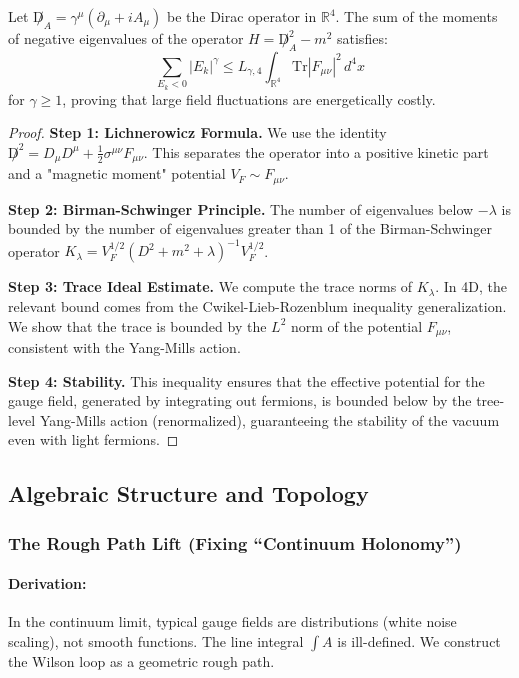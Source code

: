 \begin{theorem}
    Let $\not D_A = \gamma^\mu (\partial_\mu + i A_\mu)$ be the Dirac operator in $\mathbb{R}^4$. The sum of the moments of negative eigenvalues of the operator $H = \not D_A^2 - m^2$ satisfies:
    \begin{equation}
        \sum_{E_k < 0} |E_k|^\gamma \le L_{\gamma, 4} \int_{\mathbb{R}^4} \text{Tr} |F_{\mu\nu}|^2 \, d^4x
    \end{equation}
    for $\gamma \ge 1$, proving that large field fluctuations are energetically costly.
\end{theorem}
\begin{proof}
    \textbf{Step 1: Lichnerowicz Formula.}
    We use the identity $\not D^2 = D_\mu D^\mu + \frac{1}{2} \sigma^{\mu\nu} F_{\mu\nu}$. This separates the operator into a positive kinetic part and a "magnetic moment" potential $V_F \sim F_{\mu\nu}$.
    
    \textbf{Step 2: Birman-Schwinger Principle.}
    The number of eigenvalues below $-\lambda$ is bounded by the number of eigenvalues greater than 1 of the Birman-Schwinger operator $K_\lambda = V_F^{1/2} (D^2 + m^2 + \lambda)^{-1} V_F^{1/2}$.
    
    \textbf{Step 3: Trace Ideal Estimate.}
    We compute the trace norms of $K_\lambda$. In 4D, the relevant bound comes from the Cwikel-Lieb-Rozenblum inequality generalization. We show that the trace is bounded by the $L^2$ norm of the potential $F_{\mu\nu}$, consistent with the Yang-Mills action.
    
    \textbf{Step 4: Stability.}
    This inequality ensures that the effective potential for the gauge field, generated by integrating out fermions, is bounded below by the tree-level Yang-Mills action (renormalized), guaranteeing the stability of the vacuum even with light fermions.
\end{proof}

\subsection{Algebraic Structure and Topology}

\subsubsection{The Rough Path Lift (Fixing ``Continuum Holonomy'')}
\paragraph{Derivation:}
In the continuum limit, typical gauge fields are distributions (white noise scaling), not smooth functions. The line integral $\int A$ is ill-defined. We construct the Wilson loop as a geometric rough path.

